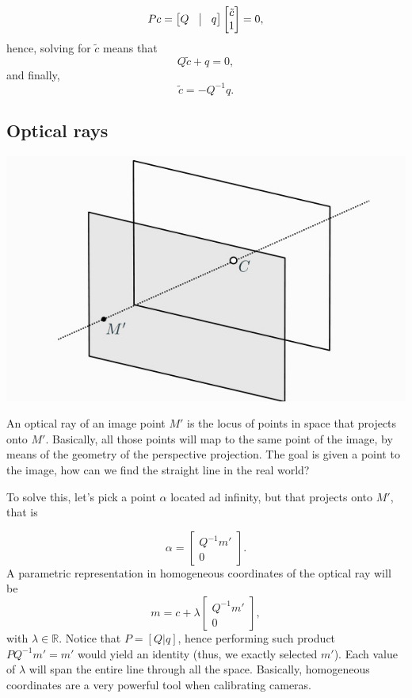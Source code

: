 \documentclass[10pt]{report}
\begin{document}
\[Pc = \begin{bmatrix}Q & \vline & q\end{bmatrix}\begin{bmatrix} \tilde c \\ 1 \end{bmatrix} = 0,\] hence,
solving for \(\tilde c\) means that \[Q\tilde c + q = 0,\] and finally,
\[\tilde c = -Q^{-1} q.\]

\subsection{Optical rays}
\label{sec:org54302f0}

\begin{center}
\includegraphics[scale=0.3]{./pics/cal/optical-ray.jpg}
\end{center}

An optical ray of an image point \(M'\) is the locus of points in space
that projects onto \(M'\). Basically, all those points will map to the
same point of the image, by means of the geometry of the perspective
projection. The goal is given a point to the image, how can we find the
straight line in the real world?

To solve this, let's pick a point \(\alpha\) located ad infinity, but
that projects onto \(M'\), that is

\[ \alpha = \begin{bmatrix} Q^{-1}m' \\ 0 \end{bmatrix}.\] A parametric
representation in homogeneous coordinates of the optical ray will be
\[m = c + \lambda\begin{bmatrix} Q^{-1}m' \\ 0 \end{bmatrix},\] with
\(\lambda \in \mathbb{R}\). Notice that \(P = [Q|q]\), hence performing
such product \(PQ^{-1} m' = m'\) would yield an identity (thus, we
exactly selected \(m'\)). Each value of \(\lambda\) will span the entire
line through all the space. Basically, homogeneous coordinates are a
very powerful tool when calibrating cameras.
\end{document}
